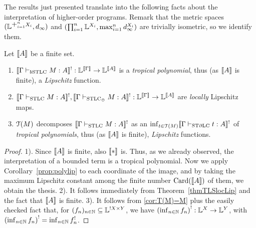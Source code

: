 The results just presented translate into the following facts about the interpretation of higher-order programs.
Remark that the metric spaces $(\Lawv^{\mathlarger{+}_{i=1}^n X_i},d_{\infty})$ and $(\prod_{i=1}^n \mathbb{L}^{X_i},\max_{i=1}^n d^{X_i}_\infty)$ are trivially isometric, so we identify them.


\begin{corollary}
Let $\llbracket A\rrbracket$ be a finite set.
\begin{enumerate}
\item $\model{\Gamma \vdash_{\BSTLC} M:A}^!:\Lawv^{\model\Gamma} \to \Lawv^{\model A}$ is a \emph{tropical polynomial}, thus (as $\llbracket A\rrbracket$ is finite), a \emph{Lipschitz} function.
\item $\llbracket\Gamma \vdash_{\mathrm{STLC}} M:A\rrbracket^!, \llbracket\Gamma \vdash_{\mathrm{STLC}_\oplus} M:A\rrbracket^!:\mathbb{L}^{\llbracket\Gamma\rrbracket} \to \mathbb{L}^{\llbracket A\rrbracket}$ are \emph{locally} Lipschitz maps.
\item $\mathcal{T}(M)$ decomposes $\llbracket\Gamma \vdash_{\mathrm{STLC}} M:A\rrbracket^!$ as an $\inf_{t\in\mathcal{T}(M)}\llbracket\Gamma\vdash_{\mathrm{ST}\partial\mathrm{LC}} t:A\rrbracket^!$ of \emph{tropical polynomials}, thus (as $\llbracket A\rrbracket$ is finite), \emph{Lipschitz} functions.
\end{enumerate}
\end{corollary} 
\begin{proof}
1). Since $\llbracket A\rrbracket$ is finite, also $\llbracket*\rrbracket$ is.
Thus, as we already observed, the interpretation of a bounded term is a tropical polynomial.
Now we apply Corollary~\ref{prop:polylip} to each coordinate of the image, and by taking the maximum Lipschitz constant among the finite number $\mathrm{Card}(\llbracket A\rrbracket)$ of them, we obtain the thesis.
2). It follows immediately from Theorem~\ref{thmTLSlocLip} and the fact that $\llbracket A\rrbracket$ is finite.
3). It follows from \autoref{cor:T(M)=M} plus the easily checked fact that, for $(f_n)_{n\in\mathbb{N}}\subseteq\mathbb{L}^{!X\times Y}$, we have $\left(\inf_{n\in\mathbb{N}} f_n\right)^!:\mathbb{L}^X\to\mathbb{L}^Y$, with $\left(\inf_{n\in\mathbb{N}} f_n\right)^!=\inf_{n\in\mathbb{N}} f_n^!$.
\end{proof}

